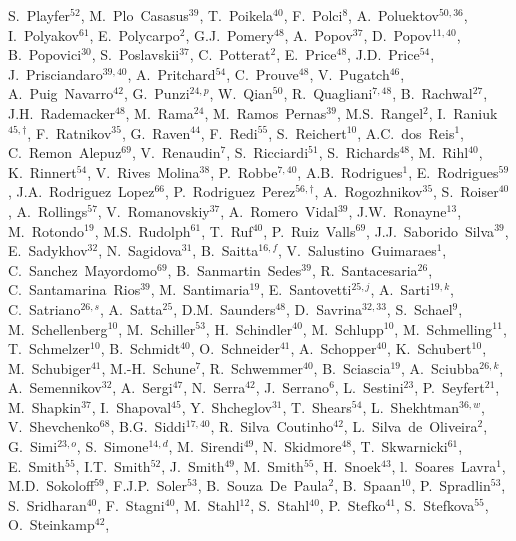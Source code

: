 \begin{flushleft}
S.~Playfer$^{52}$,
M.~Plo~Casasus$^{39}$,
T.~Poikela$^{40}$,
F.~Polci$^{8}$,
A.~Poluektov$^{50,36}$,
I.~Polyakov$^{61}$,
E.~Polycarpo$^{2}$,
G.J.~Pomery$^{48}$,
A.~Popov$^{37}$,
D.~Popov$^{11,40}$,
B.~Popovici$^{30}$,
S.~Poslavskii$^{37}$,
C.~Potterat$^{2}$,
E.~Price$^{48}$,
J.D.~Price$^{54}$,
J.~Prisciandaro$^{39,40}$,
A.~Pritchard$^{54}$,
C.~Prouve$^{48}$,
V.~Pugatch$^{46}$,
A.~Puig~Navarro$^{42}$,
G.~Punzi$^{24,p}$,
W.~Qian$^{50}$,
R.~Quagliani$^{7,48}$,
B.~Rachwal$^{27}$,
J.H.~Rademacker$^{48}$,
M.~Rama$^{24}$,
M.~Ramos~Pernas$^{39}$,
M.S.~Rangel$^{2}$,
I.~Raniuk$^{45,\dagger}$,
F.~Ratnikov$^{35}$,
G.~Raven$^{44}$,
F.~Redi$^{55}$,
S.~Reichert$^{10}$,
A.C.~dos~Reis$^{1}$,
C.~Remon~Alepuz$^{69}$,
V.~Renaudin$^{7}$,
S.~Ricciardi$^{51}$,
S.~Richards$^{48}$,
M.~Rihl$^{40}$,
K.~Rinnert$^{54}$,
V.~Rives~Molina$^{38}$,
P.~Robbe$^{7,40}$,
A.B.~Rodrigues$^{1}$,
E.~Rodrigues$^{59}$,
J.A.~Rodriguez~Lopez$^{66}$,
P.~Rodriguez~Perez$^{56,\dagger}$,
A.~Rogozhnikov$^{35}$,
S.~Roiser$^{40}$,
A.~Rollings$^{57}$,
V.~Romanovskiy$^{37}$,
A.~Romero~Vidal$^{39}$,
J.W.~Ronayne$^{13}$,
M.~Rotondo$^{19}$,
M.S.~Rudolph$^{61}$,
T.~Ruf$^{40}$,
P.~Ruiz~Valls$^{69}$,
J.J.~Saborido~Silva$^{39}$,
E.~Sadykhov$^{32}$,
N.~Sagidova$^{31}$,
B.~Saitta$^{16,f}$,
V.~Salustino~Guimaraes$^{1}$,
C.~Sanchez~Mayordomo$^{69}$,
B.~Sanmartin~Sedes$^{39}$,
R.~Santacesaria$^{26}$,
C.~Santamarina~Rios$^{39}$,
M.~Santimaria$^{19}$,
E.~Santovetti$^{25,j}$,
A.~Sarti$^{19,k}$,
C.~Satriano$^{26,s}$,
A.~Satta$^{25}$,
D.M.~Saunders$^{48}$,
D.~Savrina$^{32,33}$,
S.~Schael$^{9}$,
M.~Schellenberg$^{10}$,
M.~Schiller$^{53}$,
H.~Schindler$^{40}$,
M.~Schlupp$^{10}$,
M.~Schmelling$^{11}$,
T.~Schmelzer$^{10}$,
B.~Schmidt$^{40}$,
O.~Schneider$^{41}$,
A.~Schopper$^{40}$,
K.~Schubert$^{10}$,
M.~Schubiger$^{41}$,
M.-H.~Schune$^{7}$,
R.~Schwemmer$^{40}$,
B.~Sciascia$^{19}$,
A.~Sciubba$^{26,k}$,
A.~Semennikov$^{32}$,
A.~Sergi$^{47}$,
N.~Serra$^{42}$,
J.~Serrano$^{6}$,
L.~Sestini$^{23}$,
P.~Seyfert$^{21}$,
M.~Shapkin$^{37}$,
I.~Shapoval$^{45}$,
Y.~Shcheglov$^{31}$,
T.~Shears$^{54}$,
L.~Shekhtman$^{36,w}$,
V.~Shevchenko$^{68}$,
B.G.~Siddi$^{17,40}$,
R.~Silva~Coutinho$^{42}$,
L.~Silva~de~Oliveira$^{2}$,
G.~Simi$^{23,o}$,
S.~Simone$^{14,d}$,
M.~Sirendi$^{49}$,
N.~Skidmore$^{48}$,
T.~Skwarnicki$^{61}$,
E.~Smith$^{55}$,
I.T.~Smith$^{52}$,
J.~Smith$^{49}$,
M.~Smith$^{55}$,
H.~Snoek$^{43}$,
l.~Soares~Lavra$^{1}$,
M.D.~Sokoloff$^{59}$,
F.J.P.~Soler$^{53}$,
B.~Souza~De~Paula$^{2}$,
B.~Spaan$^{10}$,
P.~Spradlin$^{53}$,
S.~Sridharan$^{40}$,
F.~Stagni$^{40}$,
M.~Stahl$^{12}$,
S.~Stahl$^{40}$,
P.~Stefko$^{41}$,
S.~Stefkova$^{55}$,
O.~Steinkamp$^{42}$,

\end{flushleft}
